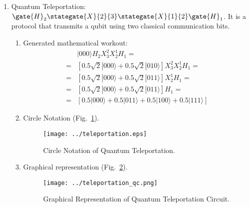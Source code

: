 \documentclass[sigconf,natbib=false]{acmart}
\begin{document}
\begin{enumerate}
\item Quantum Teleportation: $\gate{H}_2\stategate{X}{2}{3}\stategate{X}{1}{2}\gate{H}_1$. It is a protocol that transmits a qubit using two classical communication bits.
\begin{enumerate}
\item Generated mathematical workout:
\begin{align*}
&|000\rangle H_{2}X_{3}^{2}X_{2}^{1}H_{1}=\\
=& [0.5 \sqrt{2} |000\rangle +0.5 \sqrt{2} |010\rangle ]X_{3}^{2}X_{2}^{1}H_{1}=\\
=& [0.5 \sqrt{2} |000\rangle +0.5 \sqrt{2} |011\rangle ]X_{2}^{1}H_{1}=\\
=& [0.5 \sqrt{2} |000\rangle +0.5 \sqrt{2} |011\rangle ]H_{1}=\\
=& [0.5 |000\rangle +0.5 |011\rangle +0.5 |100\rangle +0.5 |111\rangle ]
\end{align*}
\item Circle Notation (Fig.~\ref{teleportation}).
\begin{figure}[!htb]
\centerline{\texttt{[image: ../teleportation.eps]}}
\caption{Circle Notation of Quantum Teleportation.}
\label{teleportation}
\end{figure}
\item Graphical representation (Fig.~\ref{teleportation_qc}).
\begin{figure}[!htb]
\centerline{\texttt{[image: ../teleportation\_qc.png]}}
\caption{Graphical Representation of Quantum Teleportation Circuit.}
\label{teleportation_qc}
\end{figure}
\end{enumerate}
\end{enumerate}
\end{document}
